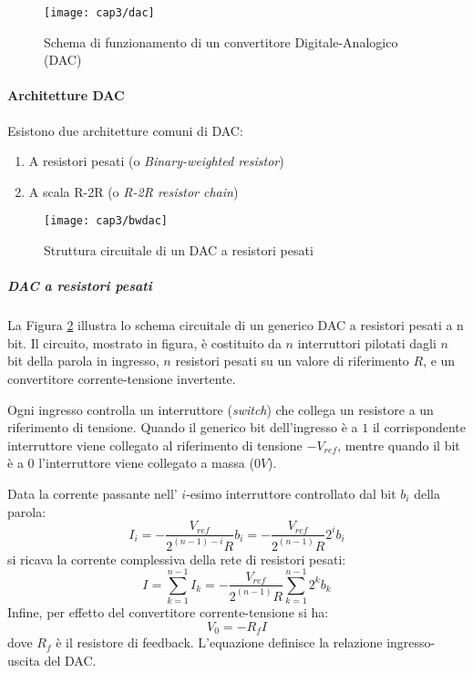 \begin{figure}  
  \begin{center}
    \texttt{[image: cap3/dac]}
    \caption{Schema di funzionamento di un convertitore Digitale-Analogico (DAC)}
    \label{dac}
  \end{center}
\end{figure}

\paragraph{Architetture DAC}
Esistono due architetture comuni di DAC:
\begin{enumerate}
	\item A resistori pesati (o \textit{Binary-weighted resistor})
	\item A scala R-2R (o \textit{R-2R resistor chain})
\end{enumerate}
\begin{figure}  
  \begin{center}
    \texttt{[image: cap3/bwdac]}
    \caption{Struttura circuitale di un DAC a resistori pesati}
    \label{bwdac}
  \end{center}
\end{figure}
\subparagraph{\textbf{DAC a resistori pesati}} La Figura \ref{bwdac} illustra lo schema circuitale di un generico DAC a resistori pesati a n bit.
Il circuito, mostrato in figura, è costituito da $n$ interruttori pilotati dagli $n$ bit della parola in ingresso, $n$ resistori pesati su un valore di riferimento $R$, e un convertitore corrente-tensione invertente.

Ogni ingresso controlla un interruttore (\textit{switch}) che collega un resistore a un riferimento di tensione. Quando il generico bit dell'ingresso è a $1$ il corrispondente interruttore viene collegato al riferimento di tensione $-V_{ref}$, mentre quando il bit è a $0$ l'interruttore viene collegato a massa ($0 V$).

Data la corrente passante nell' $i$-esimo interruttore controllato dal bit $b_i$ della parola:
\begin{equation}
	I_i=-\frac{V_{ref}}{2^{(n-1)-i}R}b_i = -\frac{V_{ref}}{2^{(n-1)}R}2^ib_i
\end{equation}
si ricava la corrente complessiva della rete di resistori pesati:
\begin{equation}
	I = \sum_{k=1}^{n-1} I_k = -\frac{V_{ref}}{2^{(n-1)}R} \sum_{k=1}^{n-1} 2^k b_k 
\end{equation}
Infine, per effetto del convertitore corrente-tensione si ha:
\begin{equation}
	V_0 = -R_f I
\end{equation}
dove $R_f$ è il resistore di feedback. L'equazione definisce la relazione ingresso-uscita del DAC.

